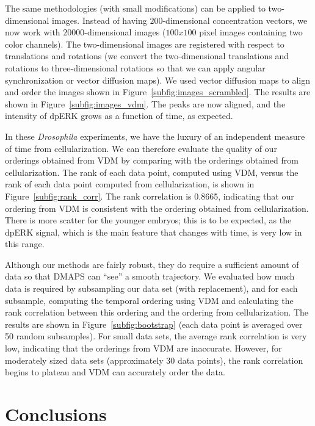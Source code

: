\documentclass{pnastwo}
\begin{document}
\begin{article}
The same methodologies (with small modifications) can be applied to two-dimensional images.
%
Instead of having $200$-dimensional concentration vectors, we now work with $20000$-dimensional images ($100x100$ pixel images containing two color channels).
%
The two-dimensional images are registered with respect to translations and rotations 
(we convert the two-dimensional translations and rotations to three-dimensional rotations so that we can apply angular synchronization or vector diffusion maps). 
%
We used vector diffusion maps to align and order the images shown in Figure~\ref{subfig:images_scrambled}.
%
The results are shown in Figure~\ref{subfig:images_vdm}.
%
The peaks are now aligned, and the intensity of dpERK grows as a function of time, as expected.

In these {\em Drosophila} experiments, we have the luxury of an independent measure of time from cellularization.
%
We can therefore evaluate the quality of our orderings obtained from VDM by comparing with the orderings obtained from cellularization.
%
The rank of each data point, computed using VDM, versus the rank of each data point computed from cellularization, is shown in Figure~\ref{subfig:rank_corr}.
%
The rank correlation is 0.8665, indicating that our ordering from VDM is consistent with the ordering obtained from cellularization.
%
There is more scatter for the younger embryos; this is to be expected, as the dpERK signal, which is the main feature that changes with time, is very low in this range.

Although our methods are fairly robust, they do require a sufficient amount of data so that DMAPS can ``see'' a smooth trajectory.
%
We evaluated how much data is required by subsampling our data set (with replacement), and for each subsample, computing the temporal ordering using VDM and calculating the rank correlation between this ordering and the ordering from cellularization.
%
The results are shown in Figure~\ref{subfig:bootstrap} (each data point is averaged over 50 random subsamples).
%
For small data sets, the average rank correlation is very low, indicating that the orderings from VDM are inaccurate. 
%
However, for moderately sized data sets (approximately 30 data points), the 
rank correlation begins to plateau and VDM can accurately order the data.

\section{Conclusions}


\end{article}
\end{document}
